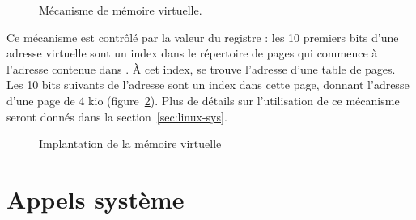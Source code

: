 \begin{figure}[h] %
\centering
{}
\caption{Mécanisme de mémoire virtuelle.}
\label{fig:memoire-virtuelle}
\end{figure} %

\label{page:mem-virt}
Ce mécanisme est contrôlé par la valeur du registre \crtrois: les 10 premiers
bits d'une adresse virtuelle sont un index dans le répertoire de pages qui
commence à l'adresse contenue dans \crtrois. À cet index, se trouve l'adresse
d'une table de pages. Les 10 bits suivants de l'adresse sont un index dans cette
page, donnant l'adresse d'une page de 4 kio (figure~\ref{fig:pagetables}). Plus
de détails sur l'utilisation de ce mécanisme seront donnés dans la
section~\ref{sec:linux-sys}.

\begin{figure}[h]

\caption{Implantation de la mémoire virtuelle}
\label{fig:pagetables}
\end{figure}

\section{Appels système}

